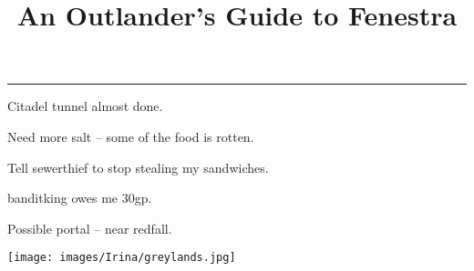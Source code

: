 \documentclass[a4paper,openany]{book}
\title{An Outlander's Guide to Fenestra}
\begin{document}
\pagestyle{empty}


\hrule

\vspace{2em}

Citadel tunnel almost done.

Need more salt -- some of the food is rotten.

Tell \gls{sewerthief} to stop stealing my sandwiches.

\Gls{banditking} owes me 30gp.

Possible portal -- near \gls{redfall}.

\pagebreak

\texttt{[image: images/Irina/greylands.jpg]}

\pagebreak


\end{document}
